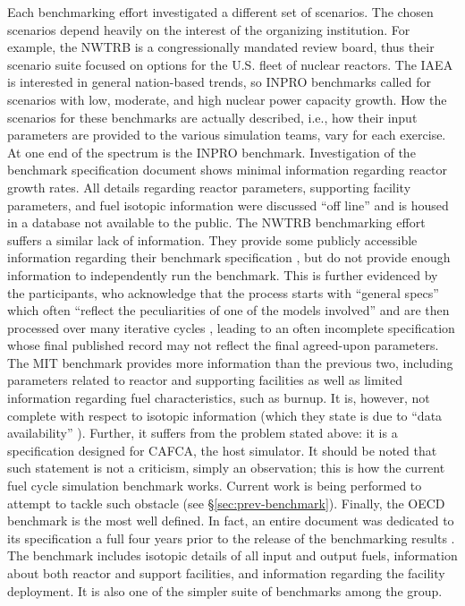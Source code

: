 Each benchmarking effort investigated a different set of scenarios. The chosen
scenarios depend heavily on the interest of the organizing institution. For
example, the NWTRB is a congressionally mandated review board, thus their
scenario suite focused on options for the U.S. fleet of nuclear reactors. The
IAEA is interested in general nation-based trends, so INPRO benchmarks called
for scenarios with low, moderate, and high nuclear power capacity growth. How
the scenarios for these benchmarks are actually described, i.e., how their input
parameters are provided to the various simulation teams, vary for each
exercise. At one end of the spectrum is the INPRO benchmark. Investigation of
the benchmark specification document \cite{_international_2009} shows minimal
information regarding reactor growth rates. All details regarding reactor
parameters, supporting facility parameters, and fuel isotopic information were
discussed ``off line'' and is housed in a database not available to the
public. The NWTRB benchmarking effort suffers a similar lack of
information. They provide some publicly accessible information regarding their
benchmark specification \cite{abkowitz_scenario_2011}, but do not provide enough
information to independently run the benchmark. This is further evidenced by the
participants, who acknowledge that the process starts with ``general specs''
which often ``reflect the peculiarities of one of the models involved'' and are
then processed over many iterative cycles \cite{piet_vision_2011}, leading to an
often incomplete specification whose final published record may not reflect the
final agreed-upon parameters. The MIT benchmark provides more information than
the previous two, including parameters related to reactor and supporting
facilities as well as limited information regarding fuel characteristics, such
as burnup. It is, however, not complete with respect to isotopic information
(which they state is due to ``data availability''
\cite{guerin_benchmark_2009}). Further, it suffers from the problem stated
above: it is a specification designed for CAFCA, the host simulator. It should
be noted that such statement is not a criticism, simply an observation; this is
how the current fuel cycle simulation benchmark works. Current work is being
performed to attempt to tackle such obstacle (see
\S\ref{sec:prev-benchmark}). Finally, the OECD benchmark is the most well
defined. In fact, an entire document was dedicated to its specification a full
four years prior to the release of the benchmarking results
\cite{boucher_specification_2008}. The benchmark includes isotopic details of
all input and output fuels, information about both reactor and support
facilities, and information regarding the facility deployment. It is also one of
the simpler suite of benchmarks among the group.

